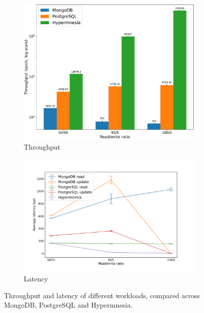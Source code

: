 \begin{figure}[htp]
  \centering
  \begin{subfigure}[t]{0.95\columnwidth}
    \centering
    \includegraphics[width=\columnwidth]{figures/tp_workload_all.pdf}
    \caption{Throughput}
    \label{fig:tp workload all}
  \end{subfigure}
  
  \begin{subfigure}[t]{0.95\columnwidth}
    \centering
    \includegraphics[width=\columnwidth]{figures/lat_workload_all.pdf}
    \caption{Latency}
    \label{fig:lat workload all}
  \end{subfigure}
  \caption{Throughput and latency of different workloads, compared across MongoDB,
  PostgreSQL and Hypermnesia.}
  \label{fig:workload all}
\end{figure}


